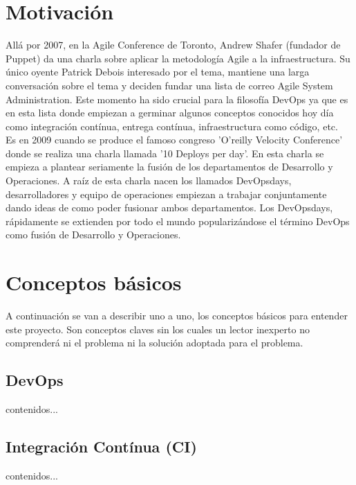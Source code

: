\section{Motivación}

	\begin{paragraph}
		Allá por 2007, en la Agile Conference de Toronto, Andrew Shafer (fundador de Puppet) da una charla sobre aplicar la metodología Agile a la infraestructura. Su único oyente Patrick Debois interesado por el tema, mantiene una larga conversación sobre el tema y deciden fundar una lista de correo Agile System Administration. Este momento ha sido crucial para la filosofía DevOps ya que es en esta lista donde empiezan a germinar algunos conceptos conocidos hoy día como integración contínua, entrega contínua, infraestructura como código, etc.\\
		Es en 2009 cuando se produce el famoso congreso  'O'reilly Velocity Conference' donde se realiza una charla llamada '10 Deploys per day'. En esta charla se empieza a plantear seriamente la fusión de los departamentos de Desarrollo y Operaciones. A raíz de esta charla nacen los llamados DevOpsdays, desarrolladores y equipo de operaciones empiezan a trabajar conjuntamente dando ideas de como poder fusionar ambos departamentos. Los DevOpsdays, rápidamente se extienden por todo el mundo popularizándose el término DevOps como fusión de Desarrollo y Operaciones.
	\end{paragraph}
\section{Conceptos básicos}
		\begin{paragraph}
			A continuación se van a describir uno a uno, los conceptos básicos para entender este proyecto. Son conceptos claves sin los cuales un lector inexperto no comprenderá ni el problema ni la solución adoptada para el problema.
		\end{paragraph}
	\subsection{DevOps}
		\begin{paragraph}
			contenidos...
		\end{paragraph}
	\subsection{Integración Contínua (CI)}
		\begin{paragraph}
			contenidos...
		\end{paragraph}
